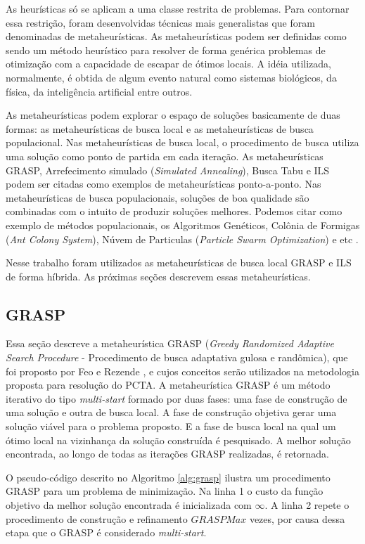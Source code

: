 As heurísticas só se aplicam a uma classe restrita de problemas. Para contornar essa restrição, foram desenvolvidas técnicas mais generalistas que foram denominadas de metaheurísticas. As metaheurísticas podem ser definidas como sendo um método heurístico para resolver de forma genérica problemas de otimização com a capacidade de escapar de ótimos locais. A idéia utilizada, normalmente, é obtida de algum evento natural como sistemas biológicos, da física, da inteligência artificial entre outros.

As metaheurísticas podem explorar o espaço de soluções basicamente de duas
formas: as metaheurísticas de busca local e as metaheurísticas de busca
populacional. Nas metaheurísticas de busca local, o procedimento de busca
utiliza uma solução como ponto de partida em cada iteração. As metaheurísticas
GRASP, Arrefecimento simulado (\textit{Simulated Annealing}), Busca Tabu e ILS
podem ser citadas como exemplos de metaheurísticas ponto-a-ponto. Nas metaheurísticas de
busca populacionais, soluções de boa qualidade são combinadas com o intuito de
produzir soluções melhores. Podemos citar como exemplo de métodos
populacionais, os Algoritmos Genéticos, Colônia de Formigas (\textit{Ant Colony
System}), Núvem de Particulas (\textit{Particle Swarm Optimization}) e etc
\cite{maritan2009}.

Nesse trabalho foram utilizados as metaheurísticas de busca local GRASP e ILS de forma híbrida. As próximas seções descrevem essas metaheurísticas.

\subsection{GRASP}

Essa seção descreve a metaheurística GRASP (\textit{Greedy Randomized Adaptive
Search Procedure} - Procedimento de busca adaptativa gulosa e randômica), que
foi proposto por Feo e Rezende \cite{resende1995}, e cujos conceitos serão
utilizados na metodologia proposta para resolução do PCTA. A metaheurística
GRASP é um método iterativo do tipo \textit{multi-start} formado por duas
fases: uma fase de construção de uma solução e outra de busca local. A fase de
construção objetiva gerar uma solução viável para o problema proposto. E a fase
de busca local na qual um ótimo local na vizinhança da solução construída é
pesquisado. A melhor solução encontrada, ao longo de todas as iterações GRASP
realizadas, é retornada.

O pseudo-código descrito no Algoritmo \ref{alg:grasp} ilustra um procedimento
GRASP para um problema de minimização. Na linha 1 o custo da função objetivo da
melhor solução encontrada é inicializada com $\infty$. A linha 2 repete o
procedimento de construção e refinamento $GRASPMax$ vezes, por causa dessa
etapa que o GRASP é considerado \textit{multi-start}.

